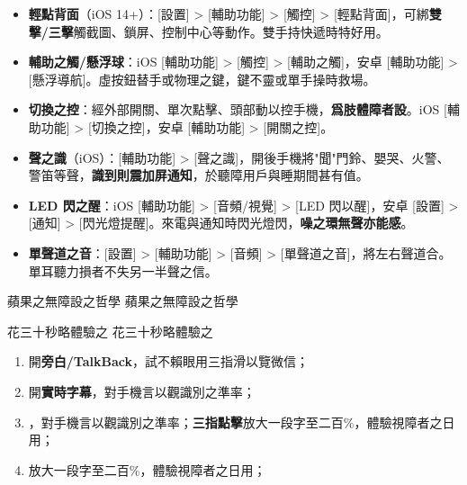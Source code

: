 
\begin{itemize}
  \item \textbf{輕點背面}（iOS 14+）：[設置] > [輔助功能] > [觸控] > [輕點背面]，可綁\textbf{雙擊/三擊}觸截圖、鎖屏、控制中心等動作。雙手持快遞時特好用。
  \item \textbf{輔助之觸/懸浮球}：iOS [輔助功能] > [觸控] > [輔助之觸]，安卓 [輔助功能] > [懸浮導航]。虛按鈕替手或物理之鍵，鍵不靈或單手操時救場。
  \item \textbf{切換之控}：經外部開關、單次點擊、頭部動以控手機，\textbf{爲肢體障者設}。iOS [輔助功能] > [切換之控]，安卓 [輔助功能] > [開關之控]。
  \item \textbf{聲之識}（iOS）：[輔助功能] > [聲之識]，開後手機將"聞"門鈴、嬰哭、火警、警笛等聲，\textbf{識到則震加屏通知}，於聽障用戶與睡期間甚有值。
  \item \textbf{LED 閃之醒}：iOS [輔助功能] > [音頻/視覺] > [LED 閃以醒]，安卓 [設置] > [通知] > [閃光燈提醒]。來電與通知時閃光燈閃，\textbf{噪之環無聲亦能感}。
  \item \textbf{單聲道之音}：[設置] > [輔助功能] > [音頻] > [單聲道之音]，將左右聲道合。單耳聽力損者不失另一半聲之信。
\end{itemize}

\begin{tcbinfo}{蘋果之無障設之哲學}
蘋果之無障設之哲學

\end{tcbinfo}

\begin{tcbpractice}{花三十秒略體驗之}
花三十秒略體驗之

\begin{enumerate}
  \item 開\textbf{旁白/TalkBack}，試不賴眼用三指滑以覽微信；
  \item 開\textbf{實時字幕}，對手機言以觀識別之準率；
  \item ，對手機言以觀識別之準率；\textbf{三指點擊}放大一段字至二百\%，體驗視障者之日用；
  \item 放大一段字至二百\%，體驗視障者之日用；
\end{enumerate}

\end{tcbpractice}
